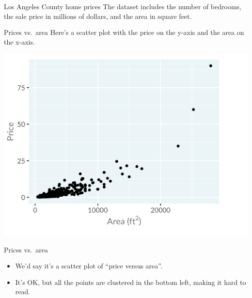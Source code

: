 \documentclass[
  ignorenonframetext,
]{beamer}
\begin{document}
\begin{frame}{Los Angeles County home prices}
\label{los-angeles-county-home-prices-1}
The dataset includes the number of bedrooms, the sale price in millions
of dollars, and the area in square feet.
\end{frame}

\begin{frame}{Prices vs.~area}
\label{prices-vs.-area}
Here's a scatter plot with the price on the y-axis and the area on the
x-axis.

\includegraphics{../images/im31.png}
\end{frame}

\begin{frame}{Prices vs.~area}
\label{prices-vs.-area-1}
\begin{itemize}
\item
  We'd say it's a scatter plot of ``price versus area''.
\item
  It's OK, but all the points are clustered in the bottom left, making
  it hard to read.
\end{itemize}
\end{frame}
\end{document}
